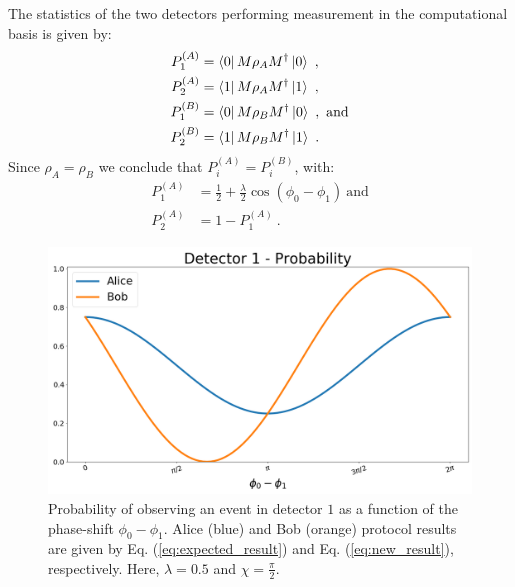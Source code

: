 \documentclass[draft,nofootinbib,prl,twocolumn,showpacs,showkeys,groupaddress,preprintnumbers,floatfix]{revtex4-1}
\newcommand{\1}{\mathbbm{1}}
\begin{document}
The statistics of the two detectors performing measurement in the computational basis is given by:
\begin{align*}
P_1^{(A)} & = \bra{0}M \rho_A M^\dagger \ket{0} ~,\\
P_2^{(A)} & = \bra{1}M \rho_A M^\dagger \ket{1} ~,\\
P_1^{(B)} & = \bra{0}M \rho_B M^\dagger \ket{0} ~,~\text{and}\\
P_2^{(B)} & = \bra{1}M \rho_B M^\dagger \ket{1}
  ~.
\end{align*}
Since $\rho_A = \rho_B$ we conclude that $P_i^{(A)} = P_i^{(B)}$, with:
\begin{subequations}
\begin{align}
P_1^{(A)} & =
  \frac{1}{2} + \frac{\lambda}{2}\cos (\phi_0 - \phi_1) ~\text{and} \\
P_2^{(A)} & = 1 - P_1^{(A)}
  ~.
\end{align}
\label{eq:expected_result}
\end{subequations}

\begin{figure}[H]
\centering
\includegraphics[width=.9\columnwidth]{img/Distinguishability.png}
\caption{Probability of observing an event in detector $1$ as a function of
	the phase-shift $\phi_0 - \phi_1$. Alice (blue) and Bob (orange) protocol
	results are given by Eq. (\ref{eq:expected_result}) and Eq.
	(\ref{eq:new_result}), respectively. Here, $\lambda = 0.5$ and $\chi =
	\frac{\pi}{2}$.
	}
\label{fig:distinguishability} 
\end{figure}
\end{document}
